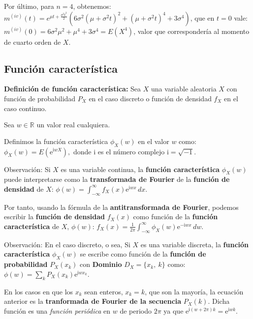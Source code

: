 \documentclass[
  letterpaper,
  DIV=11,
  numbers=noendperiod]{scrreprt}
\begin{document}
Por último, para \(n=4\), obtenemos:
\(m^{(iv)}(t)=e^{\mu t+\frac{\sigma ^2 t^2}{2}}  \left(6 \sigma ^2 \left(\mu  +\sigma ^2 t\right)^2+\left(\mu  +\sigma ^2 t\right)^4+3 \sigma  ^4\right)\),
que en \(t=0\) vale:
\(m^{(iv)}(0)=6\sigma^2\mu^2+\mu^4+3\sigma^4=E\left(X^4\right)\), valor
que correspondería al momento de cuarto orden de \(X\).

\hypertarget{funciuxf3n-caracteruxedstica}{%
\subsection{Función característica}\label{funciuxf3n-caracteruxedstica}}

\textbf{Definición de función característica:} Sea \(X\) una variable
aleatoria \(X\) con función de probabilidad \(P_X\) en el caso discreto
o función de densidad \(f_X\) en el caso continuo.

Sea \(w\in\mathbb{R}\) un valor real cualquiera.

Definimos la función característica \(\phi_X(w)\) en el valor \(w\)
como: \(\phi_X(w)=E\left(\mathrm{e}^{\mathrm{i} w X}\right),\) donde
\(\mathrm{i}\) es el número complejo \(\mathrm{i}=\sqrt{-1}\).

Observación: Si \(X\) es una variable continua, la \textbf{función
característica} \(\phi_X(w)\) puede interpretarse como la
\textbf{transformada de Fourier} de la \textbf{función de densidad} de
\(X\):
\(\phi(w)=\int_{-\infty}^\infty f_X(x)\mathrm{e}^{\mathrm{i}w x}\, dx.\)

Por tanto, usando la fórmula de la \textbf{antitransformada de Fourier},
podemos escribir la \textbf{función de densidad} \(f_X(x)\) como función
de la \textbf{función característica} de \(X\), \(\phi(w)\):
\(f_X(x)=\frac{1}{2\pi}\int_{-\infty}^\infty \phi_X(w)\mathrm{e}^{-\mathrm{i}w x}\, dw.\)

Observación: En el caso discreto, o sea, Si \(X\) es una variable
discreta, la \textbf{función característica} \(\phi_X(w)\) se escribe
como función de la \textbf{función de probabilidad} \(P_X(x_k)\) con
\textbf{Dominio} \(D_X=\{x_k,\ k\}\) como:
\(\phi(w)=\sum_{k} P_X(x_k)\mathrm{e}^{\mathrm{i}w x_k}.\)

En los casos en que los \(x_k\) sean enteros, \(x_k=k\), que son la
mayoría, la ecuación anterior es la \textbf{tranformada de Fourier de la
secuencia} \(P_X(k)\). Dicha función es una \emph{función periódica} en
\(w\) de periodo \(2\pi\) ya que
\(\mathrm{e}^{\mathrm{i}(w+2\pi)k}=\mathrm{e}^{\mathrm{i}wk}.\)
\end{document}
